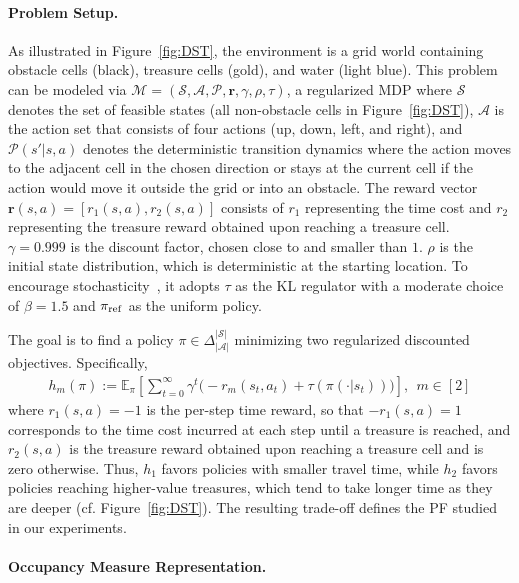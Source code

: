 \documentclass{article}
\begin{document}
\paragraph{Problem Setup.}

As illustrated in Figure~\ref{fig:DST}, the environment is a grid world containing obstacle cells (black), treasure cells (gold), and water (light blue). 
This problem can be modeled via
$\mathcal{M}=(\mathcal{S},\mathcal{A},\mathcal{P},\mathbf{r},\gamma,\rho,\tau)$, a regularized MDP
where $\mathcal{S}$ denotes the set of feasible states (all non-obstacle cells in Figure~\ref{fig:DST}), $\mathcal{A}$ is the action set that consists of four actions (up, down, left, and right), and $\mathcal{P}(s'|s,a)$ denotes the deterministic transition dynamics where the action moves to the adjacent cell in the chosen direction or stays at the current cell if the action would move it outside the grid or into an obstacle. The reward vector $\mathbf{r}(s,a)=[r_1(s,a),r_2(s,a)]$ consists of $r_1$ representing the time cost and $r_2$ representing the treasure reward obtained upon reaching a treasure cell. 
$\gamma = 0.999$ is the discount factor, chosen close to and smaller than $1$. $\rho$ is the initial state distribution, which is deterministic at the starting location. To encourage stochasticity~\citep{geist2019theory}, it adopts $\tau$ as the KL regulator %
with a moderate choice of $\beta = 1.5$ and $\pi_{\rm ref}$ as the uniform policy. 

The goal is to find a policy $\pi \in \Delta_{|\mathcal A|}^{|\mathcal S|}$ 
minimizing two regularized discounted objectives. Specifically, 
\begin{align}
 h_m(\pi) := \mathbb{E}_\pi \left[
 \sum_{t=0}^\infty \gamma^t \bigl(- r_m(s_t,a_t)+\tau(\pi(\cdot|s_t))\bigr)
 \right], ~~m\in [2]
 \label{eq: f1_discount}
\end{align}
where $r_1(s,a)=-1$ is the per-step time reward, so that $-r_1(s,a)=1$ corresponds to the time cost incurred at each step until a treasure is reached, and
$r_2(s,a)$ is the treasure reward obtained upon reaching a treasure cell and is zero otherwise. Thus, $h_1$ favors policies with smaller travel time, while $h_2$ favors policies reaching higher-value treasures, which tend to take longer time as they are deeper (cf. Figure~\ref{fig:DST}). The resulting trade-off defines the PF studied in our experiments.

\paragraph{Occupancy Measure Representation.}
\end{document}
